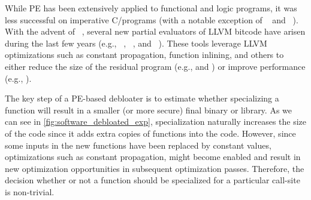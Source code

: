 %
%
While PE has been extensively applied to functional and logic programs, it was
less successful on imperative C/\cpp programs (with a notable exception of
\cmix~\cite{Andersen94} and \tempo~\cite{Consel98}). With the advent of
\llvm~\cite{llvm}, several new partial evaluators of LLVM bitcode have arisen
during the last few years (e.g., \llpe~\cite{llpe}, \occam~\cite{occam}, and
\trimmer~\cite{trimmer}). These tools leverage LLVM optimizations such as
constant propagation, function inlining, and others to either reduce the size of
the residual program (e.g., \occam and \trimmer) or improve performance (e.g.,
\llpe).

The key step of a PE-based debloater is to estimate whether specializing a function will result in a smaller (or more secure) final binary or library.
As we can see in \cref{fig:software_debloated_exp}, specialization naturally increases the size of the code since it adds extra copies of functions into the code. However, since some inputs in the new functions have been replaced by constant values, optimizations such as constant propagation, might become enabled and result in new optimization opportunities in subsequent optimization passes. Therefore, the decision whether or not a function should be specialized for a particular call-site is non-trivial.